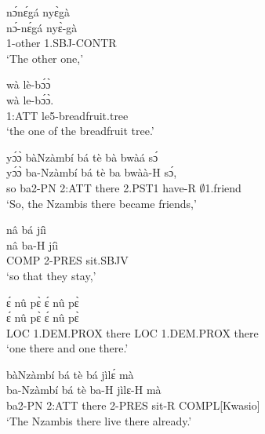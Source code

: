 \begin{exe} 
\exN\label{16}
  \glll  nɔ́nɛ́gá nyɛ̀gà \\
        nɔ́-nɛ́gá nyɛ̀-gà\\
           1-other 1.SBJ-CONTR \\
    \trans `The other one,'
\end{exe}

\begin{exe} 
\exN\label{17}
  \glll  wà lè-bɔ́ɔ̀ \\
        wà le-bɔ́ɔ̀. \\
           1:ATT le5-breadfruit.tree  \\
    \trans `the one of the breadfruit tree.'
\end{exe}

\begin{exe} 
\exN\label{18}
  \glll  yɔ́ɔ̀ bàNzàmbí bá tè bà bwàá sɔ́ \\
         yɔ́ɔ̀ ba-Nzàmbí bá tè ba bwàà-H sɔ́, \\
            so ba2-PN 2:ATT there 2.PST1 have-R $\emptyset$1.friend  \\
    \trans `So, the Nzambis there became friends,'
\end{exe}

\begin{exe} 
\exN\label{19}
  \glll  nâ bá jíì \\
         nâ ba-H jíì \\
           COMP 2-PRES sit.SBJV  \\
    \trans `so that they stay,'
\end{exe}

\begin{exe} 
\exN\label{20}
  \glll  ɛ́ nû pɛ̀  ɛ́ nû pɛ̀ \\
          ɛ́ nû pɛ̀  ɛ́ nû pɛ̀ \\
            LOC 1.DEM.PROX there LOC 1.DEM.PROX there   \\
    \trans `one there and one there.'
\end{exe}

\begin{exe} 
\exN\label{21}
  \glll   bàNzàmbí bá tè bá jìlɛ́ mà \\
          ba-Nzàmbí bá tè ba-H jìlɛ-H mà \\
              ba2-PN 2:ATT there 2-PRES sit-R COMPL[Kwasio]   \\
    \trans `The Nzambis there live there already.'
\end{exe}

